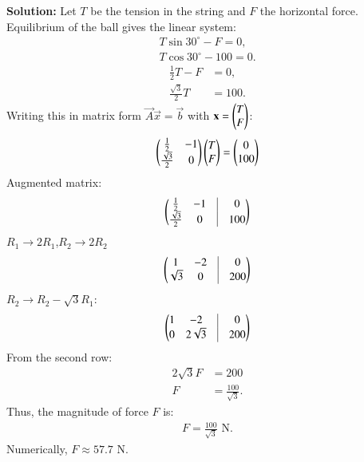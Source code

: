 \documentclass[journal]{IEEEtran}
\begin{document}
\textbf{Solution: }
Let $T$ be the tension in the string and $F$ the horizontal force.
Equilibrium of the ball gives the linear system:
\begin{align}
T\sin 30^\circ - F = 0, \\
T\cos 30^\circ - 100 = 0.
\end{align}
\begin{align}
\frac{1}{2}T - F &= 0, \\
\frac{\sqrt3}{2}T &= 100.
\end{align}
Writing this in matrix form $\vec{A}\vec{x}=\vec{b}$ with $\mathbf{x}=\begin{pmatrix}T \\ F\end{pmatrix}$:
\begin{align}
\begin{pmatrix}
\frac12 & -1 \\
\frac{\sqrt3}{2} & 0
\end{pmatrix}
\begin{pmatrix}T \\ F\end{pmatrix}
=
\begin{pmatrix}0 \\ 100\end{pmatrix}
\end{align}
Augmented matrix:
\begin{align}
\myvec{
\frac12 & -1 & \vrule & 0 \\
\frac{\sqrt3}{2} & 0 & \vrule & 100
}
\end{align}
$R_1 \rightarrow 2R_1$,$R_2 \rightarrow 2R_2$
\begin{align}
\myvec{
1 & -2 & \vrule & 0 \\
\sqrt3 & 0 & \vrule & 200
}
\end{align}
$R_2 \rightarrow R_2 - \sqrt3 R_1$:
\begin{align}
\myvec{
1 & -2 & \vrule & 0 \\
0 & 2\sqrt3 & \vrule & 200
}
\end{align}
From the second row:
\begin{align}
2\sqrt3 F &= 200 \\
F &= \frac{100}{\sqrt3}.
\end{align}
Thus, the magnitude of force $F$ is:
\begin{align}
F = \frac{100}{\sqrt3} \text{ N}.
\end{align}
Numerically,
$F \approx 57.7 \text{ N}$.
\end{document}
